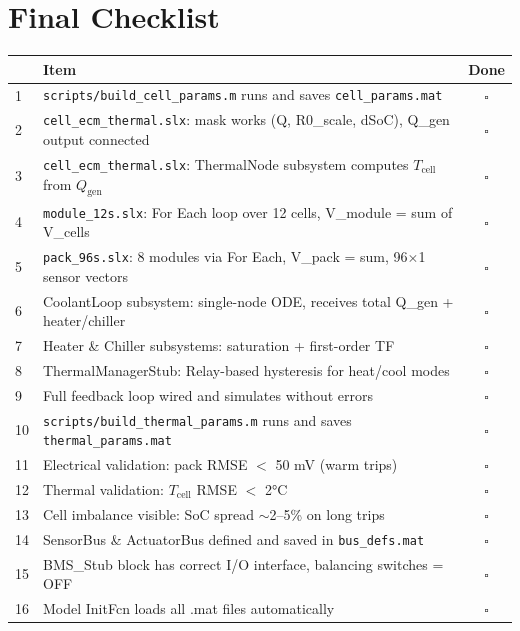 \documentclass[11pt,a4paper]{article}
\begin{document}
\newpage
\section*{Final Checklist}

\begin{center}
\renewcommand{\arraystretch}{1.3}
\begin{tabular}{p{0.4cm}p{12cm}c}
    \toprule
    & \textbf{Item} & \textbf{Done} \\
    \midrule
    1 & \texttt{scripts/build\_cell\_params.m} runs and saves \texttt{cell\_params.mat} & $\square$ \\
    2 & \texttt{cell\_ecm\_thermal.slx}: mask works (Q, R0\_scale, dSoC), Q\_gen output connected & $\square$ \\
    3 & \texttt{cell\_ecm\_thermal.slx}: ThermalNode subsystem computes $T_\text{cell}$ from $Q_\text{gen}$ & $\square$ \\
    4 & \texttt{module\_12s.slx}: For Each loop over 12 cells, V\_module = sum of V\_cells & $\square$ \\
    5 & \texttt{pack\_96s.slx}: 8 modules via For Each, V\_pack = sum, 96$\times$1 sensor vectors & $\square$ \\
    6 & CoolantLoop subsystem: single-node ODE, receives total Q\_gen + heater/chiller & $\square$ \\
    7 & Heater \& Chiller subsystems: saturation + first-order TF & $\square$ \\
    8 & ThermalManagerStub: Relay-based hysteresis for heat/cool modes & $\square$ \\
    9 & Full feedback loop wired and simulates without errors & $\square$ \\
    10 & \texttt{scripts/build\_thermal\_params.m} runs and saves \texttt{thermal\_params.mat} & $\square$ \\
    11 & Electrical validation: pack RMSE $<$ 50 mV (warm trips) & $\square$ \\
    12 & Thermal validation: $T_\text{cell}$ RMSE $<$ 2\si{\degreeCelsius} & $\square$ \\
    13 & Cell imbalance visible: SoC spread $\sim$2--5\% on long trips & $\square$ \\
    14 & SensorBus \& ActuatorBus defined and saved in \texttt{bus\_defs.mat} & $\square$ \\
    15 & BMS\_Stub block has correct I/O interface, balancing switches = OFF & $\square$ \\
    16 & Model InitFcn loads all .mat files automatically & $\square$ \\
    \bottomrule
\end{tabular}
\end{center}

\vspace{12pt}
\begin{center}
\end{center}
\end{document}
